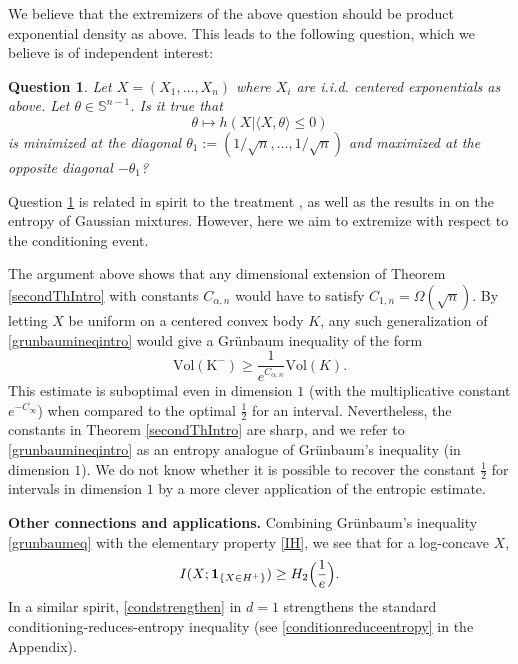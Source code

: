 \documentclass{article}
\theoremstyle{plain}
\newtheorem{question}[theorem]{Question}
\theoremstyle{definition}
\newcommand{\1}{\mathbf 1}
\begin{document}
\noindent
We believe that the extremizers of the above question should be product exponential density as above. 
This leads to the following question, which we believe is of independent interest: 
\begin{question} \label{qtheta}
    Let $X = (X_1,\ldots,X_n)$ where $X_i$ are i.i.d. centered exponentials as above. Let $\theta \in \mathbb{S}^{n-1}$. Is it true that 
    $$
    \theta \mapsto h(X|\langle X,\theta \rangle \leq 0) 
    $$
    is minimized at the diagonal $\theta_1 := (1/\sqrt{n},\ldots,1/\sqrt{n})$ and maximized at the opposite diagonal $-\theta_1$?
\end{question}
\noindent
Question \ref{qtheta} is related in spirit to the treatment \cite{brazitikosexp}, as well as the results in \cite{eskenazisg,ENT} on the entropy of Gaussian mixtures. However, here we aim to extremize with respect to the conditioning event.   

The  argument above shows that any dimensional extension of Theorem \ref{secondThIntro} with constants $C_{\alpha,n}$ would have to satisfy $C_{1,n} = \Omega(\sqrt{n})$.
By letting $X$ be uniform on a centered convex body $K$, any such generalization of \eqref{grunbaumineqintro} would give a Gr{\"u}nbaum inequality of the form
$$
\mathrm{Vol(K^-)} \geq \frac{1}{e^{C_{\alpha,n}}}\mathrm{Vol}(K). 
$$
This estimate is suboptimal even in dimension $1$ (with the multiplicative constant $e^{-C_{\infty}}$) when compared to the optimal $\frac{1}{2}$ for an interval. Nevertheless, the constants in Theorem \ref{secondThIntro} are sharp, and we refer to \eqref{grunbaumineqintro} as an entropy analogue of Gr{\"u}nbaum's inequality (in dimension $1$). 
We do not know whether it is possible to recover the constant $\frac{1}{2}$ for intervals in dimension $1$ by a more clever application of the entropic estimate.


\medskip
\textbf{Other connections and applications.} Combining Gr{\"u}nbaum's inequality \eqref{grunbaumeq} with the elementary property \eqref{IH}, we see that for a log-concave $X$, 
$$
I(X;\mathbf{1}_{\{X\in H^+\}}) \geq H_2\Bigl(\frac{1}{e}\Bigr).
$$
In a similar spirit, \eqref{condstrengthen} in $d=1$  strengthens the standard conditioning-reduces-entropy inequality (see \eqref{conditionreduceentropy} in the Appendix). 
\end{document}
